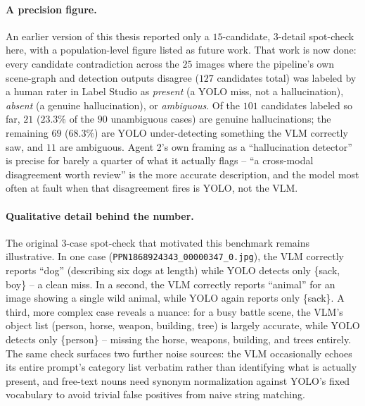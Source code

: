 \documentclass[12pt,a4paper]{report}
\begin{document}
\paragraph{A precision figure.} An earlier version of this thesis reported only a $15$-candidate, $3$-detail spot-check here, with a population-level figure listed as future work. That work is now done: every candidate contradiction across the $25$ images where the pipeline's own scene-graph and detection outputs disagree ($127$ candidates total) was labeled by a human rater in Label Studio as \textit{present} (a YOLO miss, not a hallucination), \textit{absent} (a genuine hallucination), or \textit{ambiguous}. Of the $101$ candidates labeled so far, $21$ ($23.3\%$ of the $90$ unambiguous cases) are genuine hallucinations; the remaining $69$ ($68.3\%$) are YOLO under-detecting something the VLM correctly saw, and $11$ are ambiguous. Agent 2's own framing as a ``hallucination detector'' is precise for barely a quarter of what it actually flags -- ``a cross-modal disagreement worth review'' is the more accurate description, and the model most often at fault when that disagreement fires is YOLO, not the VLM.

\paragraph{Qualitative detail behind the number.} The original $3$-case spot-check that motivated this benchmark remains illustrative. In one case (\texttt{PPN1868924343\_00000347\_0.jpg}), the VLM correctly reports ``dog'' (describing six dogs at length) while YOLO detects only \{sack, boy\} -- a clean miss. In a second, the VLM correctly reports ``animal'' for an image showing a single wild animal, while YOLO again reports only \{sack\}. A third, more complex case reveals a nuance: for a busy battle scene, the VLM's object list (person, horse, weapon, building, tree) is largely accurate, while YOLO detects only \{person\} -- missing the horse, weapons, building, and trees entirely. The same check surfaces two further noise sources: the VLM occasionally echoes its entire prompt's category list verbatim rather than identifying what is actually present, and free-text nouns need synonym normalization against YOLO's fixed vocabulary to avoid trivial false positives from naive string matching.
\end{document}
